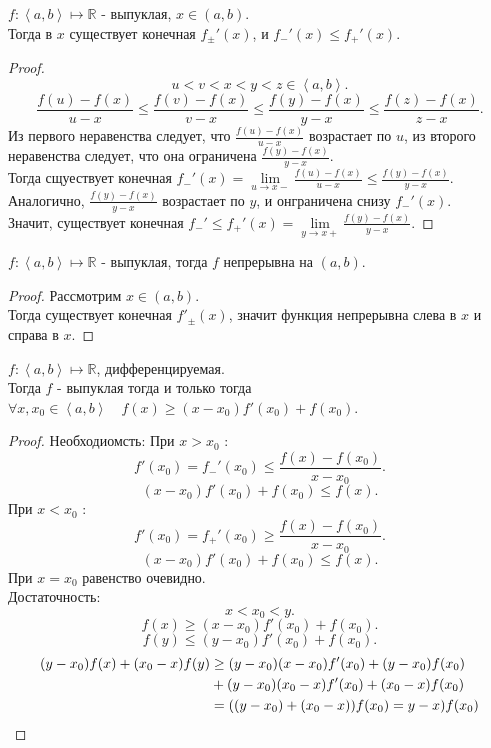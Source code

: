 \documentclass[11pt, oneside]{article}   	%
\begin{document}
\begin{theorem}
    $f: \left<a, b\right> \mapsto \mathbb{R}$ - выпуклая, $x\in \left( a, b \right) $.\\
    Тогда в $x$ существует конечная $f_{\pm}'(x)$, и $f_{-}'(x) \le f_{+}'(x)$.
    \begin{proof}
       \[ u < v < x < y < z\in \left<a, b\right> .\]
       \[ \frac{f(u)-f(x)}{u-x} \le \frac{f(v)-f(x)}{v-x} \le \frac{f(y)-f(x)}{y-x} \le \frac{f(z) - f(x)}{z-x} .\]
       Из первого неравенства следует, что $\frac{f(u)-f(x)}{u-x}$ возрастает по $u$, из второго неравенства следует, что она ограничена $\frac{f(y)-f(x)}{y-x}$.\\
       Тогда сщуествует конечная $f_{-}'(x) = \lim\limits_{u \to x-} \frac{f(u)-f(x)}{u-x} \le \frac{f(y)-f(x)}{y-x}$.\\
       Аналогично, $\frac{f(y)-f(x)}{y-x}$ возрастает по $y$, и онграничена снизу $f_{-}'(x)$.\\
       Значит, существует конечная $f_{-}' \le f_{+}'(x) = \lim\limits_{y \to x+} \frac{f(y)-f(x)}{y-x}$.
    \end{proof}
\end{theorem}
\begin{tlemma}
    $f : \left<a, b\right> \mapsto \mathbb{R}$ - выпуклая, тогда $f$ непрерывна на $\left( a, b \right) $.\\
    \begin{proof}
        Рассмотрим $x\in \left( a, b \right) $.\\
        Тогда существует конечная $f'_{\pm}(x)$, значит функция непрерывна слева в $x$ и справа в $x$.
    \end{proof}
\end{tlemma}
\begin{theorem}
    $f : \left<a, b\right> \mapsto \mathbb{R}$, дифференцируемая.\\
    Тогда $f$ - выпуклая тогда и только тогда $\forall{x, x_0\in \left<a, b\right>}\quad f(x) \ge (x-x_0)f'(x_0)+f(x_0)$.
    \begin{proof}
        Необходиомсть:
        При $x>x_0$ :
        \[ f'(x_0) = f_{-}'(x_0)\le  \frac{f(x)-f(x_0)}{x-x_0} .\]
        \[ (x-x_0)f'(x_0) + f(x_0) \le f(x) .\]
        При $x<x_0$ :
        \[ f'(x_0) = f_{+}'(x_0) \ge \frac{f(x)-f(x_0)}{x-x_0} .\]
        \[ (x-x_0)f'(x_0) + f(x_0) \le  f(x) .\]
        При $x=x_0$ равенство очевидно.\\
        Достаточность:
            \[ x < x_0 < y .\]
            \[ f(x) \ge (x-x_0)f'(x_0) + f(x_0) .\]
            \[ f(y) \le (y-x_0)f'(x_0) + f(x_0) .\]
            \begin{equation*}
                \begin{split}
                    (y-x_0)f(x) + (x_0-x)f(y) &\ge (y-x_0)(x-x_0)f'(x_0) + (y-x_0)f(x_0)\\
                                              &+(y-x_0)(x_0-x)f'(x_0)+(x_0-x)f(x_0)\\
                    &= ((y-x_0)+(x_0-x))f(x_0) = y-x)f(x_0) \qedhere
                \end{split}
            \end{equation*}
    \end{proof}
\end{theorem}
\end{document}
